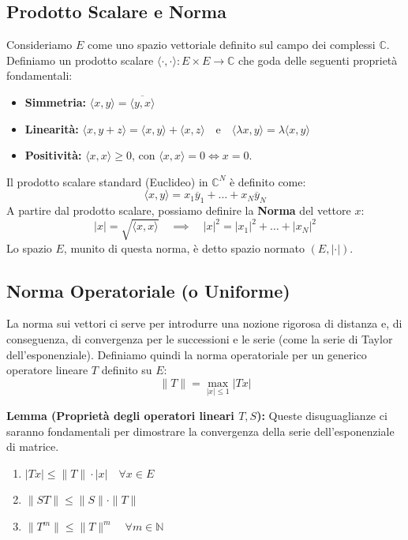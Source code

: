 \documentclass[openany]{book}
\theoremstyle{definition}
\theoremstyle{remark}
\begin{document}
\subsection*{Prodotto Scalare e Norma}
Consideriamo $E$ come uno spazio vettoriale definito sul campo dei complessi $\mathbb{C}$. Definiamo un prodotto scalare $\langle \cdot, \cdot \rangle : E \times E \to \mathbb{C}$ che goda delle seguenti proprietà fondamentali:
\begin{itemize}
    \item[i)] \textbf{Simmetria:} $\langle x, y \rangle = \overline{\langle y, x \rangle}$
    \item[ii)] \textbf{Linearità:} $\langle x, y + z \rangle = \langle x, y \rangle + \langle x, z \rangle \quad \text{e} \quad \langle \lambda x, y \rangle = \lambda \langle x, y \rangle$
    \item[iii)] \textbf{Positività:} $\langle x, x \rangle \ge 0$, con $\langle x, x \rangle = 0 \iff x=0$.
\end{itemize}

Il prodotto scalare standard (Euclideo) in $\mathbb{C}^N$ è definito come: 
\begin{equation}
    \langle x, y \rangle = x_1 \overline{y}_1 + \dots + x_N \overline{y}_N
\end{equation}
A partire dal prodotto scalare, possiamo definire la \textbf{Norma} del vettore $x$:
\begin{equation}
    |x| = \sqrt{\langle x, x \rangle} \quad \implies \quad |x|^2 = |x_1|^2 + \dots + |x_N|^2
\end{equation}
Lo spazio $E$, munito di questa norma, è detto spazio normato $(E, |\cdot|)$.

\subsection*{Norma Operatoriale (o Uniforme)}
La norma sui vettori ci serve per introdurre una nozione rigorosa di distanza e, di conseguenza, di convergenza per le successioni e le serie (come la serie di Taylor dell'esponenziale).
Definiamo quindi la norma operatoriale per un generico operatore lineare $T$ definito su $E$:
\begin{equation}
    \|T\| = \max_{|x| \le 1} |Tx|
\end{equation}

\vspace{0.5cm}
\textbf{Lemma (Proprietà degli operatori lineari $T, S$):}
Queste disuguaglianze ci saranno fondamentali per dimostrare la convergenza della serie dell'esponenziale di matrice.
\begin{enumerate}
    \item $|Tx| \le \|T\| \cdot |x| \quad \forall x \in E$
    \item $\|ST\| \le \|S\| \cdot \|T\|$
    \item $\|T^m\| \le \|T\|^m \quad \forall m \in \mathbb{N}$
\end{enumerate}
\end{document}
